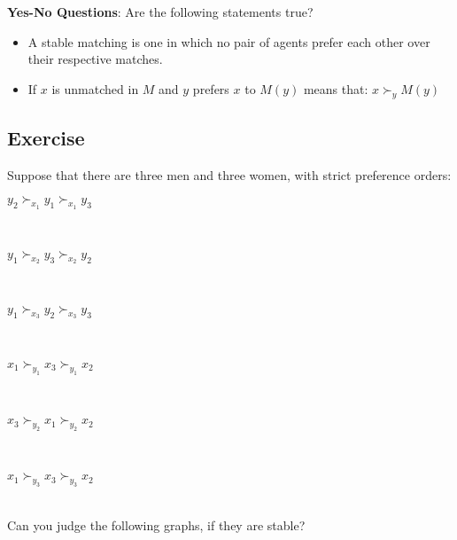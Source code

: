\textbf{Yes-No Questions}: Are the following statements true?
\begin{itemize}[leftmargin=1em+8mm]
    \item A stable matching is one in which no pair of agents prefer each other over their respective matches.
    \item If $x$ is unmatched in $M$ and $y$ prefers $x$ to $M(y)$ means that: $x \succ_y M(y)$ 
\end{itemize}
\subsection{Exercise} 
Suppose that there are three men and three women, with strict preference orders: \\  
\centerline{$y_2 \succ_{x_1} y_1 \succ_{x_1} y_3$}  \\
\centerline{$y_1 \succ_{x_2} y_3 \succ_{x_2} y_2$}  \\
\centerline{$y_1 \succ_{x_3} y_2 \succ_{x_3} y_3$}  \\
\centerline{$x_1 \succ_{y_1} x_3 \succ_{y_1} x_2$} \\  
\centerline{$x_3 \succ_{y_2} x_1 \succ_{y_2} x_2$} \\ 
\centerline{$x_1 \succ_{y_3} x_3 \succ_{y_3} x_2$} \\
Can you judge the following graphs, if they are stable?

